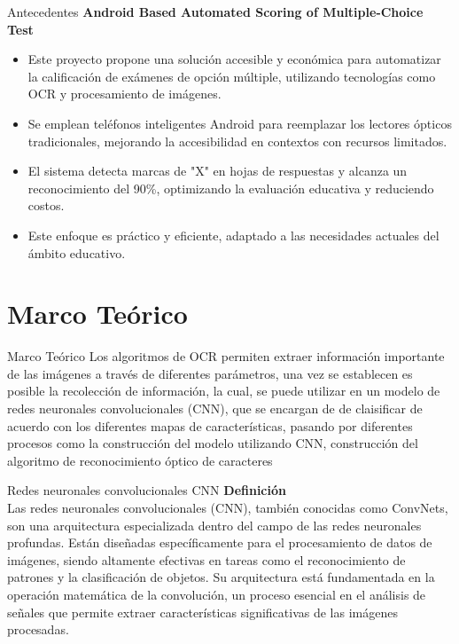 \documentclass{beamer}
\begin{document}
\begin{frame}{Antecedentes}
    \textbf{Android Based Automated Scoring of Multiple-Choice Test}
    \begin{itemize}
        \item Este proyecto propone una solución accesible y económica para automatizar la calificación de exámenes de opción múltiple, utilizando tecnologías como OCR y procesamiento de imágenes.
        \item Se emplean teléfonos inteligentes Android para reemplazar los lectores ópticos tradicionales, mejorando la accesibilidad en contextos con recursos limitados.
        \item El sistema detecta marcas de "X" en hojas de respuestas y alcanza un reconocimiento del 90\%, optimizando la evaluación educativa y reduciendo costos.
        \item Este enfoque es práctico y eficiente, adaptado a las necesidades actuales del ámbito educativo.
    \end{itemize}
\end{frame}





\section{Marco Teórico}
\begin{frame}{Marco Teórico}
    Los algoritmos de OCR permiten extraer información importante de las imágenes a través de diferentes parámetros, una vez se establecen es posible la recolección de información, la cual, se puede utilizar en un modelo de redes neuronales convolucionales (CNN), que se encargan de de claisificar de acuerdo con los diferentes mapas de características,
    pasando por diferentes procesos como la construcción del modelo utilizando CNN, construcción del algoritmo de reconocimiento óptico de caracteres
\end{frame}


\begin{frame}{Redes neuronales convolucionales CNN}
    \textbf{Definición}
    \[
    \]
    Las redes neuronales convolucionales (CNN), también conocidas como ConvNets, son una arquitectura especializada dentro del campo de las redes neuronales profundas. Están diseñadas específicamente para el procesamiento de datos de imágenes, siendo altamente efectivas en tareas como el reconocimiento de patrones y la clasificación de objetos. Su arquitectura está fundamentada en la operación matemática de la convolución, un proceso esencial en el análisis de señales que permite extraer características significativas de las imágenes procesadas.

\end{frame}
\end{document}
